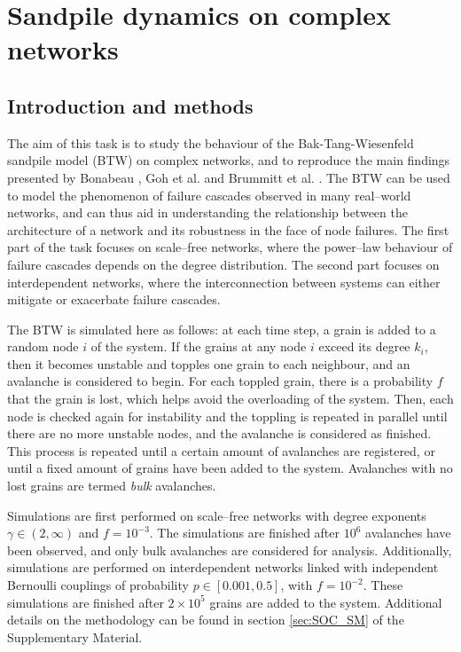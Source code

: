 \chapter{Sandpile dynamics on complex networks}


\section{Introduction and methods}
 
The aim of this task is to study the behaviour of the Bak-Tang-Wiesenfeld sandpile model (BTW) \cite{bak1987self} on complex networks, and to reproduce the main findings presented by Bonabeau \cite{bonabeau1995sandpile}, Goh et al. \cite{goh2003sandpile} and Brummitt et al. \cite{brummitt2012suppressing}. The BTW can be used to model the phenomenon of failure cascades observed in many real--world networks, and can thus aid in understanding the relationship between the architecture of a network and its robustness in the face of node failures. The first part of the task focuses on scale--free networks, where the power--law behaviour of failure cascades depends on the degree distribution. The second part focuses on interdependent networks, where the interconnection between systems can either mitigate or exacerbate failure cascades. 

The BTW is simulated here as follows: at each time step, a grain is added to a random node $i$ of the system. If the grains at any node $i$ exceed its degree $k_i$, then it becomes unstable and topples one grain to each neighbour, and an avalanche is considered to begin. For each toppled grain, there is a probability $f$ that the grain is lost, which helps avoid the overloading of the system. Then, each node is checked again for instability and the toppling is repeated in parallel until there are no more unstable nodes, and the avalanche is considered as finished. This process is repeated until a certain amount of avalanches are registered, or until a fixed amount of grains have been added to the system. Avalanches with no lost grains are termed \textit{bulk} avalanches.

Simulations are first performed on scale--free networks with degree exponents $\gamma\in(2,\infty)$ and $f=10^{-3}$. The simulations are finished after $10^6$ avalanches have been observed, and only bulk avalanches are considered for analysis. Additionally, simulations are performed on interdependent networks linked with independent Bernoulli couplings of probability $p\in[0.001, 0.5]$, with $f=10^{-2}$. These simulations are finished after $2\times10^5$ grains are added to the system. Additional details on the methodology can be found in section \ref{sec:SOC_SM} of the Supplementary Material.


